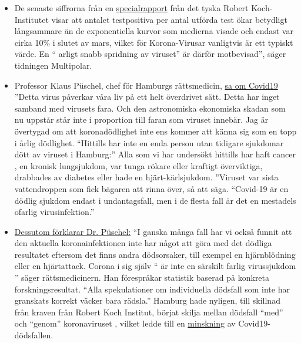 \begin{itemize}
\tightlist
\item
  De senaste siffrorna från en
  \href{https://multipolar-magazin.de/artikel/coronavirus-regierung-ignoriert-daten}{specialrapport}
  från det tyska Robert Koch-Institutet visar att antalet testpositiva
  per antal utförda test ökar betydligt långsammare än de exponentiella
  kurvor som medierna visade och endast var cirka 10\% i slutet av mars,
  vilket för Korona-Virusar vanligtvis är ett typiskt värde. En ``
  arligt snabb spridning av viruset'' är därför motbevisad'', säger
  tidningen Multipolar.
\item
  Professor Klaus Püschel, chef för Hamburgs rättsmedicin,
  \href{https://www.pressreader.com/germany/hamburger-morgenpost/20200403/281487868456736}{sa
  om Covid19} ''Detta virus påverkar våra liv på ett helt överdrivet
  sätt. Detta har inget samband med virusets fara. Och den astronomiska
  ekonomiska skadan som nu uppstår står inte i proportion till faran som
  viruset innebär. Jag är övertygad om att koronadödlighet inte ens
  kommer att känna sig som en topp i årlig dödlighet. ``Hittills har
  inte en enda person utan tidigare sjukdomar dött av viruset i
  Hamburg:'' Alla som vi har undersökt hittills har haft cancer , en
  kronisk lungsjukdom, var tunga rökare eller kraftigt överviktiga,
  drabbades av diabetes eller hade en hjärt-kärlsjukdom. ''Viruset var
  sista vattendroppen som fick bägaren att rinna över, så att säga.
  ``Covid-19 är en dödlig sjukdom endast i undantagsfall, men i de
  flesta fall är det en mestadels ofarlig virusinfektion.''
\item
  \href{https://www.abendblatt.de/hamburg/article228828787/rechtsmedizin-pueschel-hamburg-corona-virus-infektion-covid-19-coronavirus-krise-patienten-krankenhaeuser-kliniken-infektionsrate-krankheit-pandemie-test-lungenkrankheit-sars-cov-epidemie-sars-cov-2.html}{Dessutom
  förklarar Dr. Püschel:} ``I ganska många fall har vi också funnit att
  den aktuella koronainfektionen inte har något att göra med det dödliga
  resultatet eftersom det finns andra dödsorsaker, till exempel en
  hjärnblödning eller en hjärtattack. Corona i sig själv `` är inte en
  särskilt farlig virussjukdom '' säger rättsmedicinern. Han förespråkar
  statistik baserad på konkreta forskningsresultat. ``Alla spekulationer
  om individuella dödsfall som inte har granskats korrekt väcker bara
  rädsla.'' Hamburg hade nyligen, till skillnad från kraven från Robert
  Koch Institut, börjat skilja mellan dödsfall ``med'' och ``genom''
  koronaviruset , vilket ledde till en
  \href{https://www.t-online.de/nachrichten/deutschland/id_87636856/coronavirus-hamburg-will-nur-echte-covid-19-tote-zaehlen.html}{minskning}
  av Covid19-dödsfallen.
\end{itemize}

